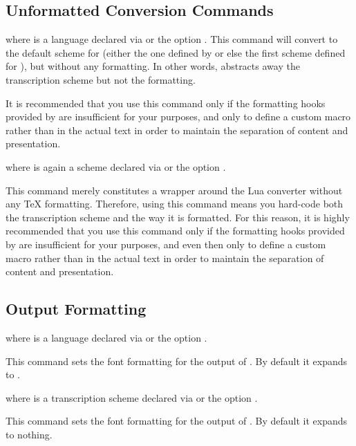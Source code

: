 \documentclass{ltxdockit}
\begin{document}
\subsection{Unformatted Conversion Commands}

\begin{ltxsyntax}

  where  is a language declared via
   or the option . This
  command will convert  to the default scheme for  (either
  the one defined by  or else the first scheme defined for
  ), but without any formatting. In other words,
   abstracts away the transcription scheme but
  not the formatting.

  It is recommended that you use this command only if the formatting hooks
  provided by  are insufficient for your purposes, and only to
  define a custom macro rather than in the actual text in order to maintain the
  separation of content and presentation.


  where  is again a scheme declared via
   or the option .

  This command merely constitutes a wrapper around the Lua converter without any
  \TeX{} formatting. Therefore, using this command means you hard-code both the
  transcription scheme and the way it is formatted.  For this reason, it is
  highly recommended that you use this command only if the formatting hooks
  provided by  are insufficient for your purposes, and even then
  only to define a custom macro rather than in the actual text in order to
  maintain the separation of content and presentation.

\end{ltxsyntax}

\subsection{Output Formatting}

\begin{ltxsyntax}

  where  is a language declared via
   or the option .

  This command sets the font formatting for the output of
  . By default it expands to
  .


  where  is a transcription scheme declared via
   or the option .

  This command sets the font formatting for the output of
  . By default it expands to nothing.

\end{ltxsyntax}
\end{document}
